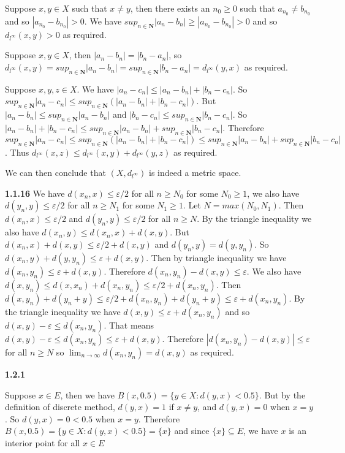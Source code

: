 \documentclass[12pt]{article}
\begin{document}
Suppose $x,y\in X$ such that $x\neq y$, then there exists an $n_0\geq 0$ such that $a_{n_0}\neq b_{n_0}$ and so $|a_{n_0}-b_{n_0}| >0$. We have $sup_{n\in \textbf{N}}|a_n-b_n|\geq |a_{n_0}-b_{n_0}|>0$ and so $d_{l^\infty}(x,y)>0$ as required. 

Suppose $x,y\in X$, then $|a_n-b_n| = |b_n-a_n|$, so $d_{l^\infty}(x,y)=sup_{n\in \textbf{N}}|a_n-b_n| =sup_{n\in \textbf{N}}|b_n-a_n|=d_{l^\infty}(y,x)$ as required. 

Suppose $x,y,z\in X$. We have $|a_n-c_n|\leq |a_n-b_n| + |b_n-c_n|$. So $sup_{n\in \textbf{N}}|a_n-c_n|\leq sup_{n\in \textbf{N}}(|a_n-b_n|+|b_n-c_n|)$. But $|a_n-b_n|\leq sup_{n\in \textbf{N}}|a_n-b_n|$ and $|b_n-c_n|\leq sup_{n\in \textbf{N}}|b_n-c_n|$. So $|a_n-b_n|+|b_n-c_n|\leq sup_{n\in \textbf{N}}|a_n-b_n|+sup_{n\in \textbf{N}}|b_n-c_n|$. Therefore $sup_{n\in \textbf{N}}|a_n-c_n|\leq sup_{n\in \textbf{N}}(|a_n-b_n|+|b_n-c_n|)\leq sup_{n\in \textbf{N}}|a_n-b_n|+sup_{n\in \textbf{N}}|b_n-c_n| $. Thus $d_{l^\infty}(x,z)\leq d_{l^\infty}(x,y)+d_{l^\infty}(y,z)$ as required. 

We can then conclude that $(X,d_{l^\infty})$ is indeed a metric space.

\textbf{1.1.16}
We have $d(x_n,x) \leq \varepsilon/2$ for all $n\geq N_0$ for some $N_0\geq 1$, we also have $d(y_n,y)\leq \varepsilon/2 $ for all $n\geq N_1$ for some $N_1\geq 1$. Let $N=max(N_0,N_1)$. Then $d(x_n,x) \leq \varepsilon/2$ and $d(y_n,y)\leq \varepsilon/2$ for all $n\geq N$. By the triangle inequality we also have $d(x_n,y)\leq d(x_n,x)+d(x,y)$. But $d(x_n,x)+d(x,y)\leq \varepsilon/2 +d(x,y)$ and $d(y_n,y) = d(y,y_n)$. So $d(x_n,y)+d(y,y_n)\leq \varepsilon +d(x,y)$. Then by triangle inequality we  have $d(x_n,y_n)\leq \varepsilon +d(x,y)$. Therefore $d(x_n,y_n)-d(x,y)\leq \varepsilon$. We also have $d(x,y_n) \leq d(x,x_n)+d(x_n,y_n)\leq \varepsilon/2 +d(x_n,y_n)$. Then $d(x,y_n)+d(y_n+y)\leq \varepsilon/2 +d(x_n,y_n)+d(y_n+y)\leq\varepsilon + d(x_n,y_n)$. By the triangle inequality we have $d(x,y)\leq \varepsilon + d(x_n,y_n)$ and so $d(x,y)-\varepsilon\leq d(x_n,y_n)$. That means $ d(x,y)-\varepsilon \leq d(x_n,y_n)\leq \varepsilon+ d(x,y)$. Therefore $|d(x_n,y_n)-d(x,y)|\leq \varepsilon$ for all $n\geq N$ so $\lim_{n\to \infty}d(x_n,y_n)=d(x,y) $ as required.

\textbf{1.2.1}

Suppose $x\in E$, then we have $B(x,0.5) = \{y\in X: d(y,x)< 0.5\}$. But by the definition of discrete method, $d(y,x) = 1$ if $x\neq y$, and $d(y,x) = 0$ when $x=y$. So $d(y,x) =0 <0.5$ when $x=y$. Therefore $B(x,0.5) = \{y\in X: d(y,x)< 0.5\} = \{x\}$ and since $\{x\}\subseteq E$, we have $x$ is an interior point for all $x\in E$
\end{document}
